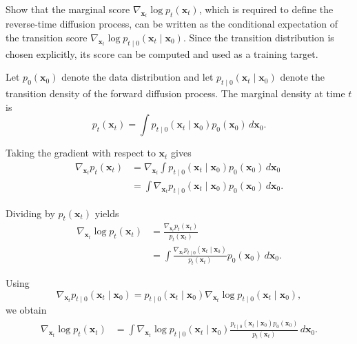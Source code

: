 \documentclass[11pt,a4paper]{article}
\begin{document}
\begin{compactproof}[title={Proof}]
Show that the marginal score $\nabla_{\mathbf{x}_t}\log p_t(\mathbf{x}_t)$, which is required to define the reverse-time diffusion process, can be written as the conditional expectation of the transition score
$\nabla_{\mathbf{x}_t}\log p_{t\mid 0}(\mathbf{x}_t\mid \mathbf{x}_0)$.
Since the transition distribution is chosen explicitly, its score can be computed and used as a training target.

Let $p_0(\mathbf{x}_0)$ denote the data distribution and let
$p_{t\mid 0}(\mathbf{x}_t\mid \mathbf{x}_0)$ denote the transition density of the forward diffusion process. The marginal density at time $t$ is
\begin{equation*}
p_t(\mathbf{x}_t)
=
\int
p_{t\mid 0}(\mathbf{x}_t\mid \mathbf{x}_0)
p_0(\mathbf{x}_0)
\,d\mathbf{x}_0.
\end{equation*}

Taking the gradient with respect to $\mathbf{x}_t$ gives
\begin{align*}
\nabla_{\mathbf{x}_t}p_t(\mathbf{x}_t)
&=
\nabla_{\mathbf{x}_t}
\int
p_{t\mid 0}(\mathbf{x}_t\mid \mathbf{x}_0)
p_0(\mathbf{x}_0)
\,d\mathbf{x}_0
\\
&=
\int
\nabla_{\mathbf{x}_t}
p_{t\mid 0}(\mathbf{x}_t\mid \mathbf{x}_0)
p_0(\mathbf{x}_0)
\,d\mathbf{x}_0.
\end{align*}

Dividing by $p_t(\mathbf{x}_t)$ yields
\begin{align*}
\nabla_{\mathbf{x}_t}\log p_t(\mathbf{x}_t)
&=
\frac{
\nabla_{\mathbf{x}_t}p_t(\mathbf{x}_t)
}{
p_t(\mathbf{x}_t)
}
\\
&=
\int
\frac{
\nabla_{\mathbf{x}_t}
p_{t\mid 0}(\mathbf{x}_t\mid \mathbf{x}_0)
}{
p_t(\mathbf{x}_t)
}
p_0(\mathbf{x}_0)
\,d\mathbf{x}_0.
\end{align*}

Using
\begin{equation*}
\nabla_{\mathbf{x}_t}
p_{t\mid 0}(\mathbf{x}_t\mid \mathbf{x}_0)
=
p_{t\mid 0}(\mathbf{x}_t\mid \mathbf{x}_0)
\nabla_{\mathbf{x}_t}
\log p_{t\mid 0}(\mathbf{x}_t\mid \mathbf{x}_0),
\end{equation*}
we obtain
\begin{align*}
\nabla_{\mathbf{x}_t}\log p_t(\mathbf{x}_t)
&=
\int
\nabla_{\mathbf{x}_t}
\log p_{t\mid 0}(\mathbf{x}_t\mid \mathbf{x}_0)
\frac{
p_{t\mid 0}(\mathbf{x}_t\mid \mathbf{x}_0)
p_0(\mathbf{x}_0)
}{
p_t(\mathbf{x}_t)
}
\,d\mathbf{x}_0.
\end{align*}


\end{compactproof}
\end{document}
